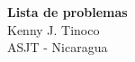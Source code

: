 \begin{center}
{
    \textbf{\Large Lista de problemas} \vspace{5mm} \\
    {\large Kenny J. Tinoco} \vspace{3mm} \\
    ASJT - Nicaragua
}
\end{center}

\thispagestyle{first-page-style}